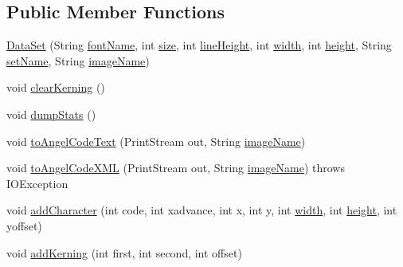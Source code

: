 \subsection*{Public Member Functions}
\begin{DoxyCompactItemize}
\item 
\mbox{\hyperlink{classorg_1_1newdawn_1_1slick_1_1tools_1_1hiero_1_1_data_set_a0b1f344c50413ba77ff7eda8ba1937d5}{Data\+Set}} (String \mbox{\hyperlink{classorg_1_1newdawn_1_1slick_1_1tools_1_1hiero_1_1_data_set_ab0f4c67d67a65d79f10572e7ce459769}{font\+Name}}, int \mbox{\hyperlink{classorg_1_1newdawn_1_1slick_1_1tools_1_1hiero_1_1_data_set_ac4d3e35615d65f0ed46ff2cea9dcc895}{size}}, int \mbox{\hyperlink{classorg_1_1newdawn_1_1slick_1_1tools_1_1hiero_1_1_data_set_adfaf42d468a6c97ab5e478c89db021d7}{line\+Height}}, int \mbox{\hyperlink{classorg_1_1newdawn_1_1slick_1_1tools_1_1hiero_1_1_data_set_afbd3cb40d79ad92dd8c605d1a6a9e420}{width}}, int \mbox{\hyperlink{classorg_1_1newdawn_1_1slick_1_1tools_1_1hiero_1_1_data_set_a4e81f554bbcc0c83a03123c0d84256c6}{height}}, String \mbox{\hyperlink{classorg_1_1newdawn_1_1slick_1_1tools_1_1hiero_1_1_data_set_aa99e808e25a854b36feda6b64cb08bc9}{set\+Name}}, String \mbox{\hyperlink{classorg_1_1newdawn_1_1slick_1_1tools_1_1hiero_1_1_data_set_afc8adad2798f5bec23a83211af00241c}{image\+Name}})
\item 
void \mbox{\hyperlink{classorg_1_1newdawn_1_1slick_1_1tools_1_1hiero_1_1_data_set_a3a3fe3ef5c04f42a4e549edfe0da0002}{clear\+Kerning}} ()
\item 
void \mbox{\hyperlink{classorg_1_1newdawn_1_1slick_1_1tools_1_1hiero_1_1_data_set_add4f6b4e306788e704d5749ba27ede82}{dump\+Stats}} ()
\item 
void \mbox{\hyperlink{classorg_1_1newdawn_1_1slick_1_1tools_1_1hiero_1_1_data_set_adb6e371c799a6a95c3a97ec95cc27e70}{to\+Angel\+Code\+Text}} (Print\+Stream out, String \mbox{\hyperlink{classorg_1_1newdawn_1_1slick_1_1tools_1_1hiero_1_1_data_set_afc8adad2798f5bec23a83211af00241c}{image\+Name}})
\item 
void \mbox{\hyperlink{classorg_1_1newdawn_1_1slick_1_1tools_1_1hiero_1_1_data_set_a597971c1aa14c5e6ba5e7a44bee55921}{to\+Angel\+Code\+X\+ML}} (Print\+Stream out, String \mbox{\hyperlink{classorg_1_1newdawn_1_1slick_1_1tools_1_1hiero_1_1_data_set_afc8adad2798f5bec23a83211af00241c}{image\+Name}})  throws I\+O\+Exception 
\item 
void \mbox{\hyperlink{classorg_1_1newdawn_1_1slick_1_1tools_1_1hiero_1_1_data_set_adb5d9def53b15ec6d2bc2974b5d2b201}{add\+Character}} (int code, int xadvance, int x, int y, int \mbox{\hyperlink{classorg_1_1newdawn_1_1slick_1_1tools_1_1hiero_1_1_data_set_afbd3cb40d79ad92dd8c605d1a6a9e420}{width}}, int \mbox{\hyperlink{classorg_1_1newdawn_1_1slick_1_1tools_1_1hiero_1_1_data_set_a4e81f554bbcc0c83a03123c0d84256c6}{height}}, int yoffset)
\item 
void \mbox{\hyperlink{classorg_1_1newdawn_1_1slick_1_1tools_1_1hiero_1_1_data_set_a8b0ac6175fed0ac2a4730b44b735466a}{add\+Kerning}} (int first, int second, int offset)
\end{DoxyCompactItemize}
